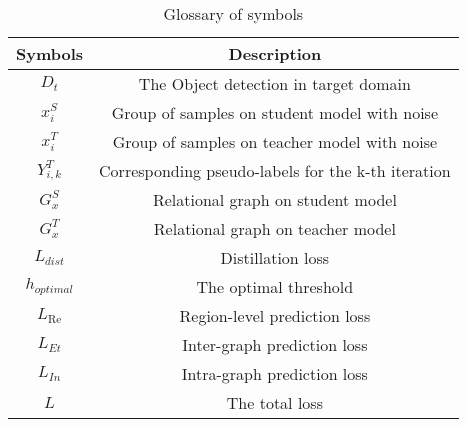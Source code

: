 \documentclass[sn-mathphys]{sn-jnl}%
\theoremstyle{thmstyleone}%
\theoremstyle{thmstyletwo}%
\theoremstyle{thmstylethree}%
\begin{document}
\begin{table}[]
	\begin{center}{	
			\caption{Glossary of symbols}		\label{table5}
			\begin{tabular}{c|c}
				\hline
				Symbols   	&Description 	  \\ \hline
				${{D}_{t}}$			&The Object detection in target domain	  \\ \hline
				$x_{i}^{S}$			&Group of samples on student model with noise	  \\ \hline
				$x_{i}^{T}$			&Group of samples on teacher model with noise	  \\ \hline
				$Y_{i,k}^{T}$		&Corresponding pseudo-labels for the k-th iteration	  \\ \hline
				$G_{x}^{S}$			&Relational graph on student model	  \\ \hline
				$G_{x}^{T}$			&Relational graph on teacher model	  \\ \hline
				${{L}_{dist}}$		&Distillation loss	  \\ \hline
				${{h}_{optimal}}$	&The optimal threshold	  \\ \hline
				${{L}_{\operatorname{Re}}}$		&Region-level prediction loss	  \\ \hline
				${{L}_{Et}}$		&Inter-graph prediction loss	  \\ \hline
				${{L}_{In}}$		&Intra-graph prediction loss	  \\ \hline
				$L$					&The total loss	  \\ \hline
				
		\end{tabular}}	
		
	\end{center}
\end{table}

%
%
\end{document}
